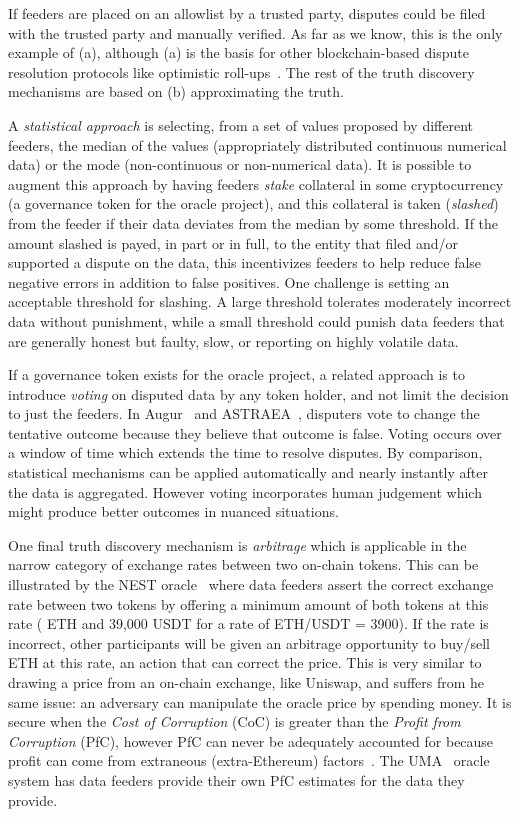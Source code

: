 If feeders are placed on an allowlist by a trusted party, disputes could be filed with the trusted party and manually verified. As far as we know, this is the only example of (a), although (a) is the basis for other blockchain-based dispute resolution protocols like optimistic roll-ups~\cite{KGCWF18}. The rest of the truth discovery mechanisms are based on (b) approximating the truth. 

A \textit{statistical approach} is selecting, from a set of values proposed by different feeders, the median of the values (\eg appropriately distributed continuous numerical data) or the mode (\eg non-continuous or non-numerical data). It is possible to augment this approach by having feeders \textit{stake} collateral in some cryptocurrency (\eg a governance token for the oracle project), and this collateral is taken (\textit{slashed}) from the feeder if their data deviates from the median by some threshold. If the amount slashed is payed, in part or in full, to the entity that filed and/or supported a dispute on the data, this incentivizes feeders to help reduce false negative errors in addition to false positives. One challenge is setting an acceptable threshold for slashing. A large threshold tolerates moderately incorrect data without punishment, while a small threshold could punish data feeders that are generally honest but faulty, slow, or reporting on highly volatile data. 

If a governance token exists for the oracle project, a related approach is to introduce \textit{voting} on disputed data by any token holder, and not limit the decision to just the feeders. In Augur~\cite{peterson2015augur} and ASTRAEA~\cite{adler2018astraea}, disputers vote to change the tentative outcome because they believe that outcome is false. Voting occurs over a window of time which extends the time to resolve disputes. By comparison, statistical mechanisms can be applied automatically and nearly instantly after the data is aggregated. However voting incorporates human judgement which might produce better outcomes in nuanced situations.

One final truth discovery mechanism is \textit{arbitrage} which is applicable in the narrow category of exchange rates between two on-chain tokens. This can be illustrated by the NEST oracle~\cite{nestwhitepaper} where data feeders assert the correct exchange rate between two tokens by offering a minimum amount of both tokens at this rate ( ETH and 39,000 USDT for a rate of ETH/USDT = 3900). If the rate is incorrect, other participants will be given an arbitrage opportunity to buy/sell ETH at this rate, an action that can correct the price. This is very similar to drawing a price from an on-chain exchange, like Uniswap, and suffers from he same issue: an adversary can manipulate the oracle price by spending money. It is secure when the \textit{Cost of Corruption} (CoC) is greater than the \textit{Profit from Corruption} (PfC), however PfC can never be adequately accounted for because profit can come from extraneous (extra-Ethereum) factors~\cite{FoBo19}. The UMA~\cite{lambur2019data} oracle system has data feeders provide their own PfC estimates for the data they provide. 

